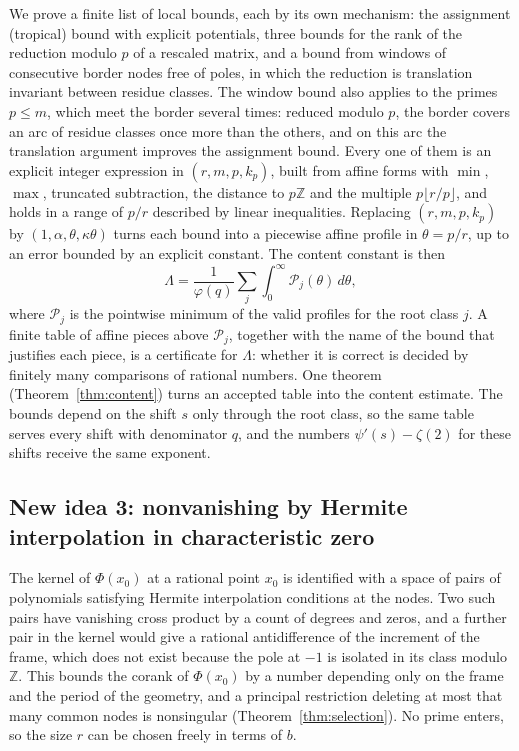 \documentclass[11pt]{amsart}
\theoremstyle{definition}
\theoremstyle{remark}
\numberwithin{equation}{section}
\newcommand{\Z}{\mathbb Z}
\begin{document}
We prove a finite list of local bounds, each by its own mechanism: the assignment (tropical) bound with explicit
potentials, three bounds for the rank of the reduction modulo $p$ of a rescaled matrix, and a bound from windows of
consecutive border nodes free of poles, in which the reduction is translation invariant between residue classes. The
window bound also applies to the primes $p\le m$, which meet the border several times: reduced modulo $p$, the border
covers an arc of residue classes once more than the others, and on this arc the translation argument improves the
assignment bound.
Every one of them is an explicit integer expression in $(r,m,p,k_p)$, built from affine forms with $\min$, $\max$,
truncated subtraction, the distance to $p\Z$ and the multiple $p\lfloor r/p\rfloor$, and holds in a range of $p/r$
described by linear inequalities.
Replacing $(r,m,p,k_p)$ by $(1,\alpha,\theta,\kappa\theta)$ turns each bound into a piecewise affine profile in
$\theta=p/r$, up to an error bounded by an explicit constant. The content constant is then
\[
 \Lambda=\frac1{\varphi(q)}\sum_j\int_0^\infty\mathcal P_j(\theta)\,d\theta,
\]
where $\mathcal P_j$ is the pointwise minimum of the valid profiles for the root class $j$. A finite table of affine
pieces above $\mathcal P_j$, together with the name of the bound that justifies each piece, is a certificate for $\Lambda$:
whether it is correct is decided by finitely many comparisons of rational numbers. One theorem
(Theorem~\ref{thm:content}) turns an accepted table into the content estimate. The bounds depend on the shift $s$ only
through the root class, so the same table serves every shift with denominator $q$, and the numbers $\psi'(s)-\zeta(2)$ for
these shifts receive the same exponent.

\subsection{New idea 3: nonvanishing by Hermite interpolation in characteristic zero}
The kernel of $\Phi(x_0)$ at a rational point $x_0$ is identified with a space of pairs of polynomials satisfying
Hermite interpolation conditions at the nodes. Two such pairs have vanishing cross product by a count of degrees and
zeros, and a further pair in the kernel would give a rational antidifference of the increment of the frame, which
does not exist because the pole at $-1$ is isolated in its class modulo $\Z$. This bounds the corank of $\Phi(x_0)$ by a
number depending only on the frame and the period of the geometry, and a principal restriction deleting at most that
many common nodes is nonsingular (Theorem~\ref{thm:selection}). No prime enters, so the size $r$ can be chosen freely
in terms of $b$.
\end{document}

